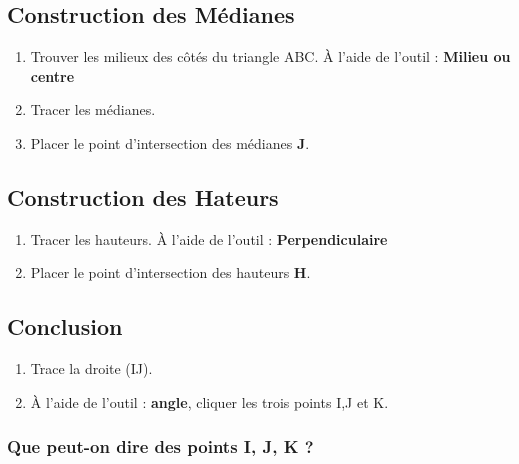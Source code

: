 \documentclass[11pt]{article}
\begin{document}
\subsection{Construction des Médianes}
\begin{enumerate}
\item Trouver les milieux des côtés du triangle ABC.
À l'aide de l'outil : \textbf{Milieu ou centre}\\
\item Tracer les médianes.
\item Placer le point d'intersection des médianes \textbf{J}.
\end{enumerate}

\subsection{Construction des Hateurs}
\begin{enumerate}
\item Tracer les hauteurs.
À l'aide de l'outil : \textbf{Perpendiculaire}\\
\item Placer le point d'intersection des hauteurs \textbf{H}.
\end{enumerate}

\subsection{Conclusion}
\begin{enumerate}
\item Trace la droite (IJ).
\item À l'aide de l'outil : \textbf{angle}, cliquer les trois points I,J et K.\\
\end{enumerate}

\subsubsection*{Que peut-on dire des points I, J, K ?}
\end{document}
